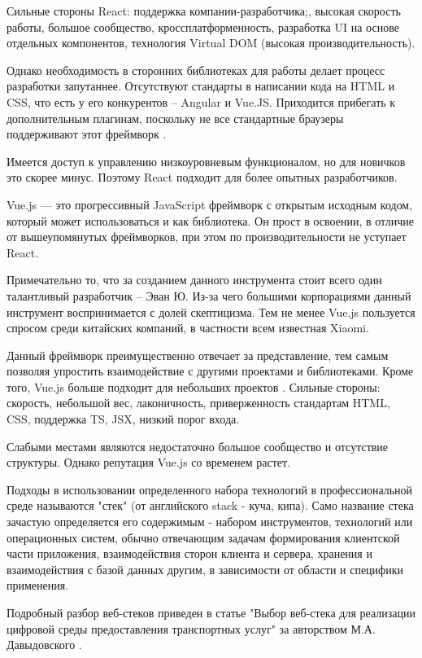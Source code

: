 Сильные стороны React: поддержка компании-разработчика;, высокая скорость работы, большое сообщество, кроссплатформенность, разработка UI на основе отдельных компонентов, технология Virtual DOM (высокая производительность).

Однако необходимость в сторонних библиотеках для работы делает процесс разработки запутаннее.
Отсутствуют стандарты в написании кода на HTML и CSS, что есть у его конкурентов – Angular и Vue.JS.
Приходится прибегать к дополнительным плагинам, поскольку не все стандартные браузеры поддерживают этот фреймворк \cite{sergacheva-framework-3}.

Имеется доступ к управлению низкоуровневым функционалом, но для новичков это скорее минус.
Поэтому React подходит для более опытных разработчиков.

Vue.js — это прогрессивный JavaScript фреймворк с открытым исходным кодом, который может использоваться и как библиотека.
Он прост в освоении, в отличие от вышеупомянутых фреймворков, при этом по производительности не уступает React.

Примечательно то, что за созданием данного инструмента стоит всего один талантливый разработчик – Эван Ю.
Из-за чего большими корпорациями данный инструмент воспринимается с долей скептицизма.
Тем не менее Vue.js пользуется спросом среди китайских компаний, в частности всем известная Xiaomi.

Данный фреймворк преимущественно отвечает за представление, тем самым позволяя упростить
взаимодействие с другими проектами и библиотеками.
Кроме того, Vue.js больше подходит для небольших проектов \cite{sergacheva-framework-4}.
Сильные стороны: скорость, небольшой вес, лаконичность, приверженность стандартам HTML, CSS, поддержка TS, JSX, низкий порог входа.

Слабыми местами являются недостаточно большое сообщество и отсутствие структуры.
Однако репутация Vue.js со временем растет.


Подходы в использовании определенного набора технологий в профессиональной среде называются "стек" (от английского stack - куча, кипа).
Само название стека зачастую определяется его содержимым - набором инструментов, технологий или операционных систем, обычно отвечающим  задачам формирования клиентской части приложения, взаимодействия сторон клиента и сервера, хранения и взаимодействия с базой данных другим, в зависимости от области и специфики применения.


Подробный разбор веб-стеков приведен в статье "Выбор веб-стека для реализации цифровой среды предоставления транспортных услуг" за авторством М.А. Давыдовского \cite{davidovsky-vibor}.

